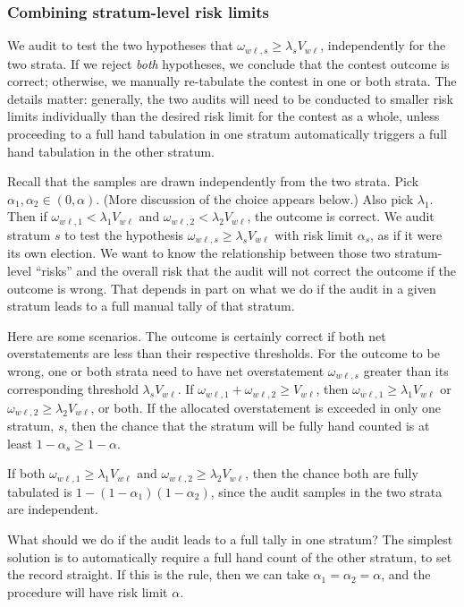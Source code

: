 \subsubsection{Combining stratum-level risk limits}\label{sec:stratumRisk}
We audit to test the two hypotheses that $\omega_{w\ell,s} \ge \lambda_s V_{w\ell}$, 
independently for the two strata.
If we reject \emph{both} hypotheses, we conclude that the contest outcome is correct;
otherwise, we manually re-tabulate the contest in one or both strata.
The details matter:
generally, the two audits will need to be conducted to smaller risk limits individually than the desired
risk limit for the contest as a whole, unless proceeding to a full hand tabulation in one stratum
automatically triggers a full hand tabulation in the other stratum.

Recall that the samples are drawn independently from the two strata.
Pick $\alpha_1, \alpha_2 \in (0,\alpha)$.
(More discussion of the choice appears below.)
Also pick $\lambda_1$.
Then if $\omega_{w\ell,1} < \lambda_1 V_{w\ell}$ and 
$\omega_{w\ell,2} < \lambda_2 V_{w\ell}$,
the outcome is correct.
We audit stratum $s$ to test the hypothesis $\omega_{w\ell,s} \ge \lambda_s V_{w\ell}$ 
with risk limit $\alpha_s$,
as if it were its own election.
We want to know the relationship between those two stratum-level ``risks'' and the 
overall risk that the audit will not correct the outcome if the outcome is wrong.
That depends in part on what we do if the audit in a given stratum leads to a full manual
tally of that stratum.

Here are some scenarios.
The outcome is certainly correct if both net overstatements are less than their 
respective thresholds. 
For the outcome to be wrong, one or both strata need to have net overstatement
$\omega_{w\ell,s}$
greater than its corresponding threshold $\lambda_s V_{w\ell}$.
If $\omega_{w\ell,1} + \omega_{w\ell,2} \ge V_{w\ell}$, then $\omega_{w\ell,1}\ge \lambda_1V_{w\ell}$
or $\omega_{w\ell,2}\ge \lambda_2V_{w\ell}$, or both.
If the allocated overstatement is exceeded in only one stratum, $s$, then the chance that the 
stratum will be fully hand counted is at least $1-\alpha_s \ge 1- \alpha$.

If both $\omega_{w\ell,1}\ge \lambda_1V_{w\ell}$
and $\omega_{w\ell,2}\ge \lambda_2V_{w\ell}$, then the chance both are fully tabulated is
$1-(1-\alpha_1)(1-\alpha_2)$, since the audit samples in the two strata are independent.

What should we do if the audit leads to a full tally in one stratum?
The simplest solution is to automatically require a full hand count of the other stratum, 
to set the record straight.
If this is the rule, then we can take $\alpha_1 = \alpha_2 = \alpha$, and the procedure will have
risk limit $\alpha$.

